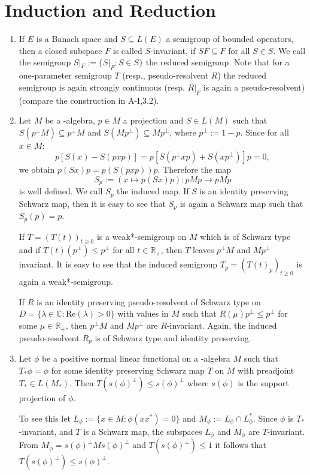 
\section{Induction and Reduction}

\begin{enumerate}[1. , wide]
\item
If $ E $ is a Banach space and $ S \subseteq L(E) $ a semigroup of bounded operators, then a closed subspace $ F $ is called $ S $-invariant, if $ SF \subseteq F $ for all $ S \in S $.
We call the semigroup $ S|_{F} := \{S|_{F} : S \in S \} $ the reduced semigroup.
Note that for a one-parameter semigroup $ T $ (resp., pseudo-resolvent $ R $) the reduced semigroup is again strongly continuous (resp. $ R|_{F} $ is again a pseudo-resolvent) (compare the construction in A-I,3.2).

\item
Let $ M $ be a \WA-algebra, $ p \in M $ a projection and $ S \in L(M) $ such that $ S(p^{\perp}M) \subseteq p^{\perp}M $ and $ S(Mp^{\perp}) \subseteq Mp^{\perp} $, where $ p^{\perp} := 1-p $.
Since for all $ x \in M $:
\[
p[S(x) - S(pxp)] = p[S(p^{\perp}xp) + S(xp^{\perp})]p = 0,
\]
we obtain $ p(Sx)p = p(S(pxp))p $.
Therefore the map
\[
S_{p} := (x \mapsto p(Sx)p) : pMp \to pMp
\]
is well defined.
We call $ S_{p} $ the induced map.
If $ S $ is an identity preserving Schwarz map, then it is easy to see that $ S_{p} $ is again a Schwarz map such that $ S_{p}(p) = p $.

If $ T = (T(t))_{t\geq0} $ is a weak*-semigroup on $ M $ which is of Schwarz type and if $ T(t)(p^{\perp}) \leq p^{\perp} $ for all $ t \in \mathbb{R}_{+} $, then $ T $ leaves $ p^{\perp}M $ and $ Mp^{\perp} $ invariant.
It is easy to see that the induced semigroup $ T_{p} = (T(t)_{p})_{t\geq0} $ is again a weak*-semigroup.

If $ R $ is an identity preserving pseudo-resolvent of Schwarz type on $ D = \{\lambda \in \mathbb{C} : \text{Re}(\lambda) > 0\} $ with values in $ M $ such that $ R(\mu)p^{\perp} \leq p^{\perp} $ for some $ \mu \in \mathbb{R}_{+} $, then $ p^{\perp}M $ and $ Mp^{\perp} $ are $ R $-invariant.
Again, the induced pseudo-resolvent $ R_{p} $ is of Schwarz type and identity preserving.

\item
Let $ \phi $ be a positive normal linear functional on a \WA-algebra $ M $ such that $ T_{*}\phi = \phi $ for some identity preserving Schwarz map $ T $ on $ M $ with preadjoint $ T_{*} \in L(M_{*}) $.
Then $ T(s(\phi)^{\perp}) \leq s(\phi)^{\perp} $ where $ s(\phi) $ is the support projection of $ \phi $.

To see this let $ L_{\phi} := \{x \in M: \phi(xx^{*}) = 0\} $ and $ M_{\phi} := L_{\phi} \cap L_{\phi}^{*} $.
Since $ \phi $ is $ T_{*} $-invariant, and $ T $ is a Schwarz map, the subspaces $ L_{\phi} $ and $ M_{\phi} $ are $ T $-invariant.
From $ M_{\phi} = s(\phi)^{\perp}Ms(\phi)^{\perp} $ and $ T(s(\phi)^{\perp}) \leq 1 $ it follows that $ T(s(\phi)^{\perp}) \leq s(\phi)^{\perp} $.

\end{enumerate}
%

